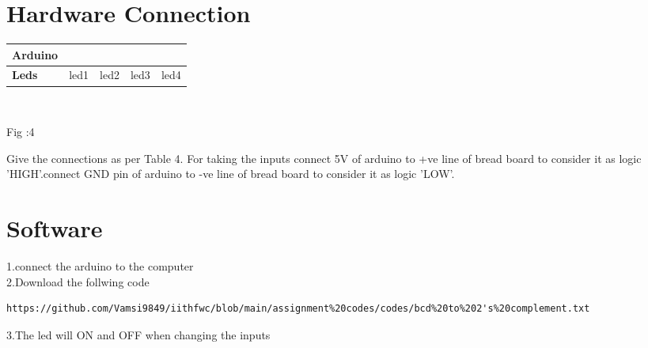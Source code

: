 \documentclass[10pt, a4paper]{article}
\begin{document}
     
    \section{Hardware Connection}


    
     \begin{tabularx}{0.4\textwidth} {  
  | >{\centering\arraybackslash}X
  | >{\centering\arraybackslash}X 
  | >{\centering\arraybackslash}X 
  | >{\centering\arraybackslash}X  
  | >{\centering\arraybackslash}X |}
  \hline
\textbf{Arduino} &  2  &  3  &  4  &  5\\
\hline
\textbf{Leds}    & led1 & led2 & led3 & led4\\
\hline
 \end{tabularx}\\

 \begin{center}
 Fig :4
   \end{center}




   Give the connections as per Table 4. For taking the inputs connect 5V of arduino to +ve line of bread board to consider it as logic 'HIGH'.connect GND pin of arduino to -ve line of bread board to consider it as logic 'LOW'.


    
    
	
	


  
  \section{Software}
  1.connect the arduino to the computer
  \\2.Download the follwing code
  
  \begin{lstlisting}
https://github.com/Vamsi9849/iithfwc/blob/main/assignment%20codes/codes/bcd%20to%202's%20complement.txt
  \end{lstlisting}
  3.The led will ON and OFF when changing the inputs




    

    
	
\end{document}

